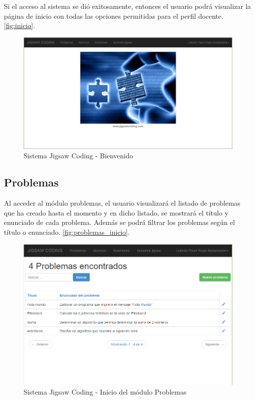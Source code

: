 Si el acceso al sistema se dió exitosamente, entonces el usuario podrá visualizar la página de inicio con todas las opciones permitidas para el perfil docente. \autoref{fig:inicio}.

\begin{figure}[h!]
\centering
\caption[SJC Inicio]{Sistema Jigsaw Coding - Bienvenido}
\label{fig:inicio}
\includegraphics[scale=0.5]{figuras/usodelsistema/docente/inicio}
\end{figure}

\subsection{Problemas}
Al acceder al módulo problemas, el usuario visualizará el listado de problemas que ha creado hasta el momento y en dicho listado, se mostrará el título y enunciado de cada problema. Además se podrá filtrar los problemas según el título o enunciado. \autoref{fig:problemas_inicio}.

\begin{figure}[h!]
\centering
\caption[SJC Problemas]{Sistema Jigsaw Coding - Inicio del módulo Problemas}
\label{fig:problemas_inicio}
\includegraphics[scale=0.5]{figuras/usodelsistema/docente/problemas_inicio}
\end{figure}

